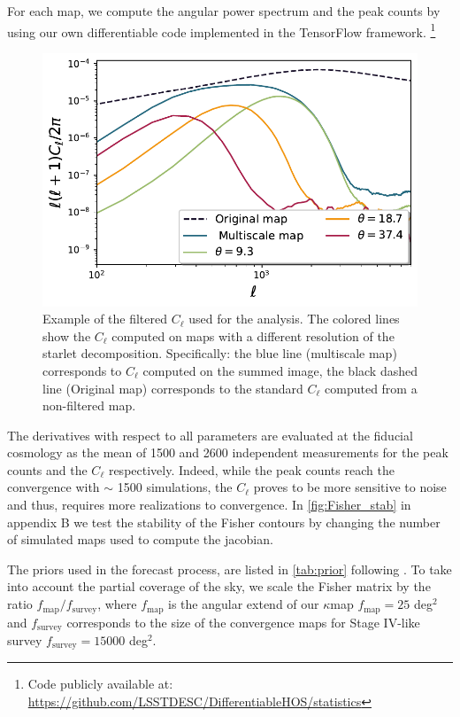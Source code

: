 \documentclass[twocolumn,twocolappendix]{aastex63}
\begin{document}
For each map, we compute the angular power spectrum and the peak counts by using our own differentiable code implemented in the TensorFlow framework. \footnote{
Code publicly available at: \\ \href{https://github.com/LSSTDESC/DifferentiableHOS/tree/main/DifferentiableHOS/statistics}{https://github.com/LSSTDESC/DifferentiableHOS/statistics}  }
\begin{figure}\label{window}
    \centering
    \includegraphics[width=0.95\columnwidth]{paper/figures/window.pdf}
    \caption{Example of the filtered $C_{\ell}$ used for the analysis. The colored lines show the $C_{\ell}$ computed on maps with a different resolution of the starlet decomposition. Specifically: the blue line (multiscale map) corresponds to $C_{\ell}$ computed on the summed image, the black dashed line (Original map) corresponds to the standard $C_{\ell}$ computed from a non-filtered map. }
     \label{fig:window}
\end{figure}



The derivatives with respect to all parameters are evaluated at the fiducial cosmology as the mean of 1500 and 2600 independent measurements for the peak counts and the $C_{\ell}$ respectively. Indeed, while the peak counts reach the convergence with $\sim$ 1500 simulations, the $C_{\ell}$ proves to be more sensitive to noise and thus, requires more realizations to convergence.
In \autoref{fig:Fisher_stab} in appendix B we test the stability of the Fisher contours by changing the number of simulated maps used to compute the jacobian.


The priors used in the forecast process, are listed in \autoref{tab:prior} following \citet{zhang2022transitioning}.
To take into account the partial coverage of the sky, we scale the Fisher matrix by the ratio $f_{\text{map}}/f_{\text{survey}}$, where $f_{\text{map}}$ is the angular extend of our $\kappa$map $f_{\text{map}}=25$ deg$^2$ and $f_{\text{survey}}$ corresponds to the size of the convergence maps for Stage IV-like survey $f_{\text{survey}}=15000$ deg$^2$.
\end{document}
